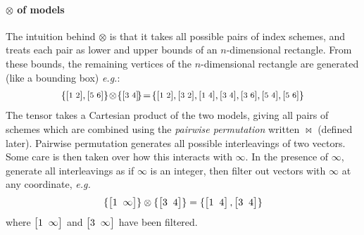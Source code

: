 \documentclass[10pt,preprint]{sigplanconf}
\theoremstyle{definition}
\newcommand{\eg}{\emph{e.g.}}
\newcommand{\vtwohs}[2]{\setlength{\arraycolsep}{0em}
\left[\begin{array}{cc}#1 \, & \, #2\end{array}\right]\!}
\newcommand{\vtwoh}[2]{\setlength{\arraycolsep}{0em}
\left[\begin{array}{cc}#1 \; & \; #2\end{array}\right]}
\begin{document}
\paragraph{$\otimes$ of models}

The intuition behind $\otimes$ is that it takes all possible pairs of
index schemes, and treats each pair as lower and upper bounds of an
$n$-dimensional rectangle. From these bounds,
the remaining vertices of the $n$-dimensional rectangle are
generated (like a bounding box) \eg{}:
\begin{align*}
{\small{
\{\vtwohs{1}{2},\vtwohs{5}{6}\,\}\!\otimes\!\{\vtwohs{3}{4}\}\!=\!\{\vtwohs{1}{2},\vtwohs{3}{2},\vtwohs{1}{4},\vtwohs{3}{4},
   \vtwohs{3}{6},\vtwohs{5}{4},\vtwohs{5}{6}\,\}
}}
\end{align*}
The tensor takes a Cartesian product of the two models,
giving all pairs of schemes which are combined using the
\emph{pairwise permutation} written $\bowtie$ (defined later).
Pairwise permutation generates all possible interleavings of two
vectors. Some care is then taken over how this interacts with $\infty$.
In the presence of $\infty$, generate all interleavings as if $\infty$ is
an integer, then filter out vectors with $\infty$ at any coordinate, \eg{}
\begin{align*}
\{\vtwoh{1}{\infty}\} \otimes \{\vtwoh{3}{4}\} =
\{\vtwoh{1}{4}, \vtwoh{3}{4}\}
\end{align*}
%
where $\vtwoh{1}{\infty}$ and $\vtwoh{3}{\infty}$ have been filtered.
\end{document}
